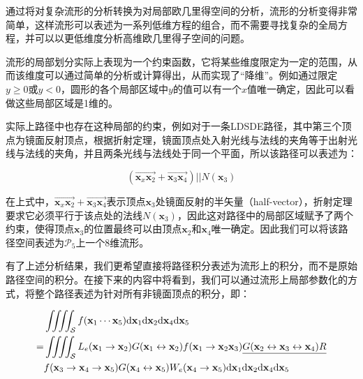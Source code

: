 通过将对复杂流形的分析转换为对局部欧几里得空间的分析，流形的分析变得非常简单，这样流形可以表述为一系列低维方程的组合，而不需要寻找复杂的全局方程，并可以以更低维度分析高维欧几里得子空间的问题。

流形的局部划分实际上表现为一个约束函数，它将某些维度限定为一定的范围，从而该维度可以通过简单的分析或计算得出，从而实现了“降维”。例如通过限定$y\geq 0$或$y<0$，圆形的各个局部区域中$y$的值可以有一个$x$值唯一确定，因此可以看做这些局部区域是1维的。

实际上路径中也存在这种局部的约束，例如对于一条LDSDE路径，其中第三个顶点为镜面反射顶点，根据折射定理，镜面顶点处入射光线与法线的夹角等于出射光线与法线的夹角，并且两条光线与法线处于同一个平面，所以该路径可以表述为：

\begin{equation}
	(\overrightarrow {\mathbf{x}_x\mathbf{x}_2}+\overrightarrow{\mathbf{x}_3\mathbf{x}_4})||N(\mathbf{x}_3)
\end{equation}

\noindent 在上式中，$\overrightarrow {\mathbf{x}_x\mathbf{x}_2}+\overrightarrow{\mathbf{x}_3\mathbf{x}_4}$表示顶点$\mathbf{x}_3$处镜面反射的半矢量（half-vector），折射定理要求它必须平行于该点处的法线$N(\mathbf{x}_3)$，因此这对路径中的局部区域赋予了两个约束，使得顶点$\mathbf{x}_3$的位置最终可以由顶点$\mathbf{x}_2$和$\mathbf{x}_4$唯一确定。因此我们可以将该路径空间表述为$\mathcal{P}_5$上一个8维流形。

有了上述分析结果，我们更希望直接将路径积分表述为流形上的积分，而不是原始路径空间的积分。在接下来的内容中将看到，我们可以通过流形上局部参数化的方式，将整个路径表述为针对所有非镜面顶点的积分，即：

\begin{equation}\label{e:mlt-integral-on-manifold}
\begin{aligned}
	&\iiiint_{\mathcal{S}}f(\mathbf{x}_1\cdots\mathbf{x}_5){\rm d}\mathbf{x}_1{\rm d}\mathbf{x}_2{\rm d}\mathbf{x}_4{\rm d}\mathbf{x}_5\\
	=&\iiiint_{\mathcal{S}}L_e(\mathbf{x}_1\to\mathbf{x}_2)G(\mathbf{x}_1\leftrightarrow\mathbf{x}_2)f(\mathbf{x}_1\to\mathbf{x}_2\mathbf{x}_3)\underline{G(\mathbf{x}_2\leftrightarrow\mathbf{x}_3\leftrightarrow\mathbf{x}_4)R}\\
	&f(\mathbf{x}_3\to\mathbf{x}_4\to\mathbf{x}_5)G(\mathbf{x}_4\leftrightarrow\mathbf{x}_5)W_e(\mathbf{x}_4\to\mathbf{x}_5){\rm d}\mathbf{x}_1{\rm d}\mathbf{x}_2{\rm d}\mathbf{x}_4{\rm d}\mathbf{x}_5
\end{aligned}
\end{equation}

